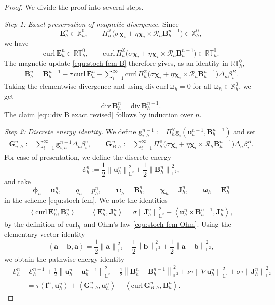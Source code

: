 \documentclass[10pt,a4paper]{amsart}
\newcommand{\bb}{\mathbb}
\newcommand{\bff}{\boldsymbol}
\newcommand{\curlh}{\mathrm{curl}_h\,}
\newcommand{\curl}{\mathrm{curl}\,}
\newcommand{\divg}{\mathrm{div}\,}
\newcommand{\inpro}[2]{\left\langle#1,#2\right\rangle}
\newcommand{\norm}[2]{\left\|{#1}\right\|_{#2}}
\begin{document}
\begin{proof}
	We divide the proof into several steps.
	
	\emph{Step 1: Exact preservation of magnetic divergence.}
	Since
	\[
	\bff E_h^n\in\bb X_h^0,
	\qquad
	\Pi_h^{\bb X}\bigl(\sigma\bff\chi_i+\eta\bff\chi_i\times\mathcal R_h\bff B_h^{n-1}\bigr)\in\bb X_h^0,
	\]
	we have
	\[
	\curl\bff E_h^n\in\bb{RT}_h^0,
	\qquad
	\curl\Pi_h^{\bb X}\bigl(\sigma\bff\chi_i+\eta\bff\chi_i\times\mathcal R_h\bff B_h^{n-1}\bigr)\in\bb{RT}_h^0.
	\]
	The magnetic update \eqref{equ:stoch fem B} therefore gives, as an identity in $\bb{RT}_h^0$,
	\begin{align}\label{equ:B update strong revised}
		\bff B_h^n
		=
		\bff B_h^{n-1}
		-\tau\,\curl\bff E_h^n
		-\sum_{i=1}^{\infty}
		\curl\Pi_h^{\bb X}\bigl(\sigma\bff\chi_i+\eta\bff\chi_i\times\mathcal R_h\bff B_h^{n-1}\bigr)\Delta_n\beta_i^B.
	\end{align}
	Taking the elementwise divergence and using $\divg\curl\bff\omega_h=0$ for all $\bff\omega_h\in\bb X_h^0$, we get
	\[
	\divg\bff B_h^n=\divg\bff B_h^{n-1}.
	\]
	The claim \eqref{equ:div B exact revised} follows by induction over $n$.
	
	\emph{Step 2: Discrete energy identity.}
	We define $\bff g_{i,h}^{n-1}:= \Pi_h^{\bb V} \bff g_i(\bff u_h^{n-1},\bff B_h^{n-1})$ and set
	\begin{align}\label{equ:G u G B revised}
		\bff G_{u,h}^n
		:=
		\sum_{i=1}^{\infty}\bff g_{i,h}^{n-1}\Delta_n\beta_i^u,
		\qquad
		\bff G_{B,h}^n
		:=
		\sum_{i=1}^{\infty}
		\Pi_h^{\bb X}\bigl(\sigma\bff\chi_i+\eta\bff\chi_i\times\mathcal R_h\bff B_h^{n-1}\bigr)\Delta_n\beta_i^B.
	\end{align}
	For ease of presentation, we define the discrete energy
	\[
	\mathcal E_h^n
	:=
	\frac12\norm{\bff u_h^n}{\bb L^2}^2
	+
	\frac12\norm{\bff B_h^n}{\bb L^2}^2,
	\]
	and take 
	\[
	\bff\phi_h=\bff u_h^n,\qquad
	q_h=p_h^n,\qquad
	\bff\psi_h=\bff B_h^n,\qquad
	\bff\chi_h=\bff J_h^n,\qquad
	\bff\omega_h=\bff E_h^n
	\]
	in the scheme \eqref{equ:stoch fem}. We note the identities
	\begin{align*}
	\inpro{\curl\bff E_h^n}{\bff B_h^n}
	&=
	\inpro{\bff E_h^n}{\bff J_h^n}
	=
	\sigma\norm{\bff J_h^n}{\bb L^2}^2
	-
	\inpro{\bff u_h^n\times\bff B_h^{n-1}}{\bff J_h^n},
	\end{align*}
	by the definition of $\curlh$ and Ohm's law \eqref{equ:stoch fem Ohm}. 
	Using the elementary vector identity
	\[
	\inpro{\bff a-\bff b}{\bff a}
	=
	\frac12\norm{\bff a}{\bb L^2}^2
	-
	\frac12\norm{\bff b}{\bb L^2}^2
	+
	\frac12\norm{\bff a-\bff b}{\bb L^2}^2,
	\]
	we obtain the pathwise energy identity
	\begin{align}\label{equ:energy identity revised}
		&\mathcal E_h^n-\mathcal E_h^{n-1}
		+
		\frac12\norm{\bff u_h^n-\bff u_h^{n-1}}{\bb L^2}^2
		+
		\frac12\norm{\bff B_h^n-\bff B_h^{n-1}}{\bb L^2}^2
		+
		\nu\tau\norm{\nabla\bff u_h^n}{\bb L^2}^2
		+
		\sigma\tau\norm{\bff J_h^n}{\bb L^2}^2
		\nonumber\\
		&\qquad
		=
		\tau\inpro{\bff f^n}{\bff u_h^n}
		+
		\inpro{\bff G_{u,h}^n}{\bff u_h^n}
		-
		\inpro{\curl\bff G_{B,h}^n}{\bff B_h^n}.
	\end{align}
	

\end{proof}
\end{document}
